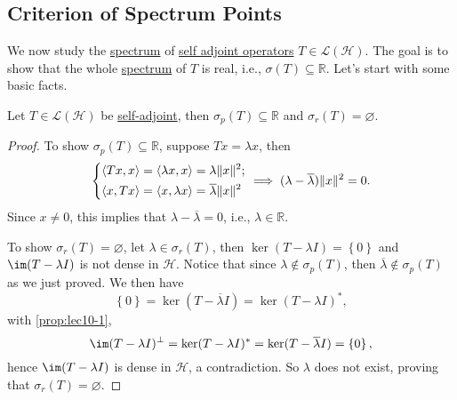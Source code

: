 \subsection{Criterion of Spectrum Points}
We now study the \hyperref[def:spectrum-point]{spectrum} of \hyperref[def:self-adjoint-op]{self adjoint operators} \(T\in \mathcal{L} (\mathcal{H} )\). The goal is to show that the whole \hyperref[def:spectrum-point]{spectrum} of \(T\) is real, i.e., \(\sigma (T) \subseteq \mathbb{R} \). Let's start with some basic facts.

\begin{lemma}
	Let \(T\in \mathcal{L} (\mathcal{H} )\) be \hyperref[def:self-adjoint-op]{self-adjoint}, then \(\sigma _p(T) \subseteq \mathbb{R} \) and \(\sigma _r(T) = \varnothing \).
\end{lemma}
\begin{proof}
	To show \(\sigma _p(T) \subseteq \mathbb{R} \), suppose \(Tx=\lambda x\), then
	\[
		\begin{dcases}
			\left\langle Tx, x \right\rangle = \left\langle \lambda x, x \right\rangle = \lambda \lVert x \rVert ^{2}; \\
			\left\langle x, Tx \right\rangle = \left\langle x, \lambda x \right\rangle = \overline{\lambda} \lVert x \rVert ^{2}
		\end{dcases}
		\implies (\lambda - \overline{\lambda}) \lVert x \rVert ^{2} = 0.
	\]
	Since \(x \neq 0\), this implies that \(\lambda - \overline{\lambda} = 0\), i.e., \(\lambda \in \mathbb{R} \).

	To show \(\sigma _r(T) = \varnothing \), let \(\lambda \in \sigma _r(T)\), then \(\ker (T-\lambda I) = \left\{ 0 \right\} \) and \(\im (T-\lambda I)\) is not dense in \(\mathcal{H} \). Notice that since \(\lambda \notin \sigma _p(T)\), then \(\overline{\lambda} \notin \sigma _p(T)\) as we just proved. We then have
	\[
		\left\{ 0 \right\} = \ker (T-\overline{\lambda} I) = \ker (T-\lambda I)^{\ast},
	\]
	with \autoref{prop:lec10-1},
	\[
		\im (T-\lambda I)^{\perp} = \ker (T-\lambda I)^{\ast} = \ker (T - \overline{\lambda} I) = \left\{ 0 \right\} ,
	\]
	hence \(\im (T - \lambda I)\) is dense in \(\mathcal{H} \), a contradiction. So \(\lambda \) does not exist, proving that \(\sigma _r(T)= \varnothing \).
\end{proof}
